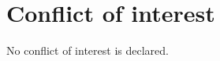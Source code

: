 \documentclass{bioinfo}
\begin{document}
\vspace*{-1pt}

\section*{Conflict of interest}
No conflict of interest is declared. 





%
%
%
%
%
%
%
%


\end{document}
